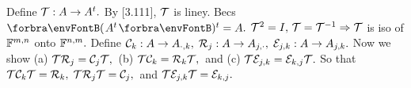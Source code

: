 \pagebreak
\def\fT{\mT}\def\fC{\mC}\def\fR{\mR}\def\fP{\mE}

\BulletPointX{}\;\;Define $\fT:A\rightarrow A^t.$ By [3.111], $\fT$ is liney. Becs $\Par{A^t}{^t}=A.$ \TextB{}
$\fT^2=I,\,\fT=\fT^{-1}\Rightarrow \fT$ is iso of ${\mathbb{F}}^{m,n}$ onto ${\mathbb{F}}^{n,m}.$ \;Define $\fC_k:A\rightarrow A_{\cdot,k},\;\fR_j:A\rightarrow A_{j,\cdot},\;\fP_{j,k}:A\rightarrow A_{j,k}.$\TextB{}
Now we show (a) \uline{$\fT\fR_j=\fC_j\fT,$} \,(b) \uline{$\fT\fC_k=\fR_k\fT,$} \,and (c) \uline{$\fT\fP_{j,k}=\fP_{k,j}\fT.$}\TextB{\vspace{2pt}}
So that $\fT\fC_k\fT=\fR_k,\;\fT\fR_j\fT=\fC_j,$ \,and $\fT\fP_{j,k}\fT=\fP_{k,j}.$\TextB{\vspace{4pt}}
